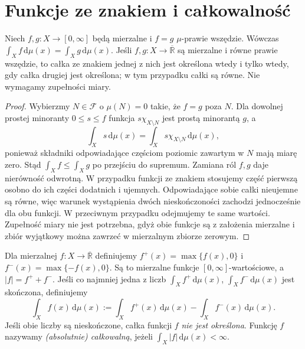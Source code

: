 \section{Funkcje ze znakiem i całkowalność}

\begin{twierdzenie}
\label{thm:ae-integral-invariance}
Niech $f,g:X\to[0,\infty]$ będą mierzalne i
$f=g$ $\mu$-prawie wszędzie. Wówczas
$\int_Xf\,\mathrm d\mu(x)=\int_Xg\,\mathrm d\mu(x)$.
Jeśli $f,g:X\to\overline{\mathbb R}$ są mierzalne
i równe prawie wszędzie, to całka ze znakiem jednej
z nich jest określona wtedy i tylko wtedy, gdy całka
drugiej jest określona; w tym przypadku całki są równe.
Nie wymagamy zupełności miary.
\end{twierdzenie}
\begin{proof}
Wybierzmy $N\in\mathcal F$ o $\mu(N)=0$ takie,
że $f=g$ poza $N$. Dla dowolnej prostej minoranty
$0\le s\le f$ funkcja $s\chi_{X\setminus N}$
jest prostą minorantą $g$, a
\[
\int_Xs\,\mathrm d\mu(x)
=\int_Xs\chi_{X\setminus N}\,\mathrm d\mu(x),
\]
ponieważ składniki odpowiadające częściom poziomic
zawartym w $N$ mają miarę zero. Stąd
$\int_X f\le\int_X g$ po przejściu do supremum.
Zamiana ról $f,g$ daje nierówność odwrotną.
W przypadku funkcji ze znakiem stosujemy część
pierwszą osobno do ich części dodatnich i ujemnych.
Odpowiadające sobie całki nieujemne są równe, więc
warunek wystąpienia dwóch nieskończoności zachodzi
jednocześnie dla obu funkcji. W przeciwnym przypadku
odejmujemy te same wartości. Zupełność miary nie jest
potrzebna, gdyż obie funkcje są z założenia mierzalne
i zbiór wyjątkowy można zawrzeć w mierzalnym zbiorze zerowym.
\end{proof}

\begin{definicja}
\label{def:positive-negative-parts}
Dla mierzalnej $f:X\to\overline{\mathbb R}$ definiujemy
$f^+(x)=\max\{f(x),0\}$ i
$f^-(x)=\max\{-f(x),0\}$. Są to mierzalne funkcje
$[0,\infty]$-wartościowe, a $|f|=f^++f^-$.
Jeśli co najmniej jedna z liczb
$\int_Xf^+\,\mathrm d\mu(x)$,
$\int_Xf^-\,\mathrm d\mu(x)$ jest skończona, definiujemy
\begin{equation}\label{eq:signed-integral}
\int_X f(x)\,\mathrm d\mu(x)
:=\int_Xf^+(x)\,\mathrm d\mu(x)
-\int_Xf^-(x)\,\mathrm d\mu(x).
\end{equation}
Jeśli obie liczby są nieskończone, całka funkcji $f$
\emph{nie jest określona}. Funkcję $f$ nazywamy
\emph{(absolutnie) całkowalną}, jeżeli
$\int_X|f|\,\mathrm d\mu(x)<\infty$.
\end{definicja}

